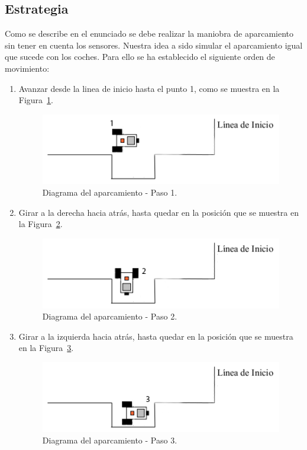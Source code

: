 \subsection{Estrategia}
Como se describe en el enunciado se debe realizar la maniobra de aparcamiento sin tener en cuenta los sensores. Nuestra idea a sido simular el aparcamiento igual que sucede con los coches. Para ello se ha establecido el siguiente orden de movimiento:
\begin{enumerate}
	\item Avanzar desde la linea de inicio hasta el punto 1, como se muestra en la Figura~\ref{paso1}.

\begin{figure}[H]
 \centering
 \includegraphics[scale=0.7]{./img/recorrido2.png}
 \caption{Diagrama del aparcamiento - Paso 1.}
 \label{paso1}
\end{figure}

	\item Girar a la derecha hacia atrás, hasta quedar en la posición que se muestra en la  Figura~\ref{paso2}.
	
	\begin{figure}[H]
 \centering
 \includegraphics[scale=0.7]{./img/recorrido3.png}
 \caption{Diagrama del aparcamiento - Paso 2.}
 \label{paso2}
\end{figure}

\item Girar a la izquierda hacia atrás, hasta quedar en la posición que se muestra en la  Figura~\ref{paso3}.
	
	\begin{figure}[H]
 \centering
 \includegraphics[scale=0.7]{./img/recorrido4.png}
 \caption{Diagrama del aparcamiento - Paso 3.}
 \label{paso3}
\end{figure}

\end{enumerate}

